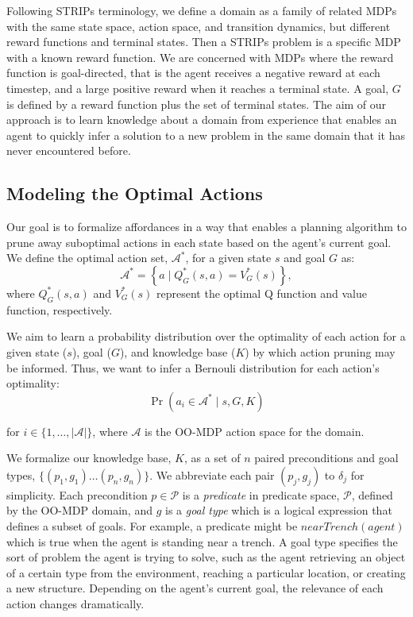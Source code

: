 \documentclass[letterpaper]{article}
\begin{document}
Following STRIPs terminology, we define a domain as a family of
related MDPs with the same state space, action space, and transition
dynamics, but different reward functions and terminal states.  Then a
STRIPs problem is a specific MDP with a known reward function.  We are
concerned with MDPs where the reward function is goal-directed, that
is the agent receives a negative reward at each timestep, and a large
positive reward when it reaches a terminal state.  A goal, $G$ is
defined by a reward function plus the set of terminal states.  The aim
of our approach is to learn knowledge about a domain from experience
that enables an agent to quickly infer a solution to a new problem in
the same domain that it has never encountered before.


\subsection{Modeling the Optimal Actions}

Our goal is to formalize affordances in a way that enables a planning
algorithm to prune away suboptimal actions in each state based on the
agent's current goal. We define the optimal action set,
$\mathcal{A}^*$, for a given state $s$ and goal $G$ as:
\begin{equation}
\mathcal{A}^* = \left\{ a \mid Q^*_G(s,a) = V^*_G(s) \right\}, 
\label{eq:opt_act_set}
\end{equation}
where $Q^*_G(s,a)$ and $V^*_G(s)$ represent the optimal Q function and 
value function, respectively.

We aim to learn a probability distribution over the optimality of each action
for a given state ($s$), goal ($G$), and knowledge base ($K$) by which
action pruning may be informed. Thus, we want to infer a Bernouli
distribution for each action's optimality:
\begin{equation}
\Pr(a_i \in \mathcal{A}^* \mid s, G, K)
\label{eq:master}
\end{equation}

\noindent for $i \in \{1, \ldots, |\mathcal{A}|\}$, where
$\mathcal{A}$ is the OO-MDP action space for the domain.

We formalize our knowledge base, $K$, as a set of $n$ paired
preconditions and goal types, $\{ (p_1, g_1) \ldots (p_{n}, g_{n})
\}$. We abbreviate each pair $(p_j, g_j)$ to $\delta_j$ for
simplicity. Each precondition $p \in \mathcal{P}$ is a {\it predicate}
in predicate space, $\mathcal{P}$, defined by the OO-MDP domain, and
$g$ is a {\it goal type} which is a logical expression that defines a
subset of goals. For example, a predicate might be $nearTrench(agent)$
which is true when the agent is standing near a trench. A goal type
specifies the sort of problem the agent is trying to solve, such as
the agent retrieving an object of a certain type from the environment,
reaching a particular location, or creating a new structure.
Depending on the agent's current goal, the relevance of each action
changes dramatically.
\end{document}
